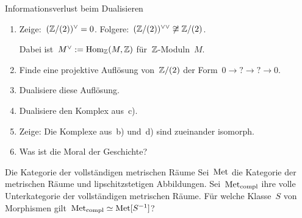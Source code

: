 \documentclass{uebblatt}
\begin{document}

\begin{aufgabe}{Informationsverlust beim Dualisieren}
\begin{enumerate}
\item Zeige:~$(\mathbb{Z}/(2))^\vee = 0$.
Folgere:~$(\mathbb{Z}/(2))^{\vee\vee} \not\cong \mathbb{Z}/(2)$.

Dabei ist~$M^\vee := \mathrm{Hom}_{\mathbb{Z}}(M,\mathbb{Z})$ für~$\mathbb{Z}$-Moduln~$M$.
\item Finde eine projektive Auflösung von~$\mathbb{Z}/(2)$ der Form~$0 \to {?} \to {?} \to
0$.
\item Dualisiere diese Auflösung.
\item Dualisiere den Komplex aus~c).
\item Zeige: Die Komplexe aus~b) und~d) sind zueinander isomorph.
\item Was ist die Moral der Geschichte?
\end{enumerate}
\end{aufgabe}

\begin{aufgabe}{Die Kategorie der vollständigen metrischen Räume}
Sei~$\mathrm{Met}$ die Kategorie der metrischen Räume und lipschitzstetigen
Abbildungen. Sei~$\mathrm{Met}_\mathrm{compl}$ ihre volle Unterkategorie der
vollständigen metrischen Räume. Für welche Klasse~$S$ von Morphismen
gilt~$\mathrm{Met}_\mathrm{compl} \simeq \mathrm{Met}[S^{-1}]$?

\end{aufgabe}

\end{document}
